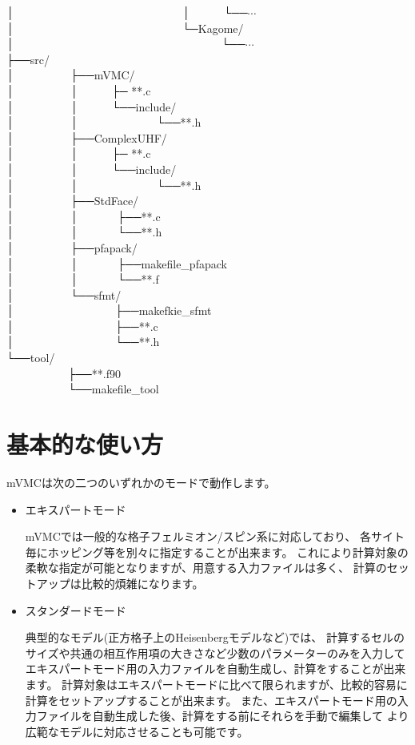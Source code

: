 │~~~~~~~~~~~~~~~~~~~~~~~~~~~~~~│~~~~~~└──$\cdots$\\
│~~~~~~~~~~~~~~~~~~~~~~~~~~~~~~└─Kagome/\\
│~~~~~~~~~~~~~~~~~~~~~~~~~~~~~~~~~~~~~└──$\cdots$\\
├──src/\\
│~~~~~~~~~~├──mVMC/\\
│~~~~~~~~~~│~~~~~~├─ **.c\\
│~~~~~~~~~~│~~~~~~└──include/\\
│~~~~~~~~~~│~~~~~~~~~~~~~~└──**.h\\
│~~~~~~~~~~├──ComplexUHF/\\
│~~~~~~~~~~│~~~~~~├─ **.c\\
│~~~~~~~~~~│~~~~~~└──include/\\
│~~~~~~~~~~│~~~~~~~~~~~~~~└──**.h\\
│~~~~~~~~~~├──StdFace/\\
│~~~~~~~~~~│~~~~~~~├──**.c\\
│~~~~~~~~~~│~~~~~~~└──**.h\\
│~~~~~~~~~~├──pfapack/\\
│~~~~~~~~~~│~~~~~~~├──makefile\_pfapack\\
│~~~~~~~~~~│~~~~~~~└──**.f\\
│~~~~~~~~~~└──sfmt/\\
│~~~~~~~~~~~~~~~~~~├──makefkie\_sfmt\\
│~~~~~~~~~~~~~~~~~~├──**.c\\
│~~~~~~~~~~~~~~~~~~└──**.h\\
└──tool/\\
~~~~~~~~~~~├──**.f90\\
~~~~~~~~~~~└──makefile\_tool\\

\newpage
\section{基本的な使い方}

mVMCは次の二つのいずれかのモードで動作します。
\begin{itemize}
\item エキスパートモード

  mVMCでは一般的な格子フェルミオン/スピン系に対応しており、
  各サイト毎にホッピング等を別々に指定することが出来ます。
  これにより計算対象の柔軟な指定が可能となりますが、用意する入力ファイルは多く、
  計算のセットアップは比較的煩雑になります。
  
\item スタンダードモード

  典型的なモデル(正方格子上のHeisenbergモデルなど)では、
  計算するセルのサイズや共通の相互作用項の大きさなど少数のパラメーターのみを入力して
  エキスパートモード用の入力ファイルを自動生成し、計算をすることが出来ます。
  計算対象はエキスパートモードに比べて限られますが、比較的容易に計算をセットアップすることが出来ます。
  また、エキスパートモード用の入力ファイルを自動生成した後、計算をする前にそれらを手動で編集して
  より広範なモデルに対応させることも可能です。

\end{itemize}

